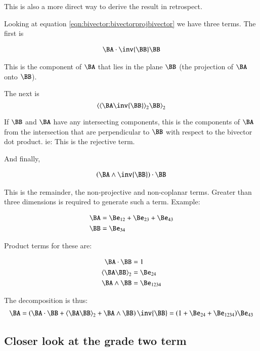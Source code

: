 This is also a more direct way to derive the result in retrospect.

Looking at equation \ref{eqn:bivector:bivectorprojbivector} we have three terms.  The first is

\begin{align}\label{eqn:bivector:foo1}
\BA \cdot \inv{\BB} \BB
\end{align}

This is the component of $\BA$ that lies in the plane $\BB$ (the projection of $\BA$ onto $\BB$).

The next is
\begin{equation}\label{eqn:bivector:gpgradetwo}
\gpgradetwo{\gpgradetwo{\BA\inv{\BB}} \BB}
\end{equation}

If $\BB$ and $\BA$ have any intersecting components, this is the components of $\BA$ from the intersection that are perpendicular to $\BB$ with respect to the bivector dot product.  ie: This is the rejective term.

And finally,

\begin{align}\label{eqn:bivector:foo2}
\left(\BA \wedge \inv{\BB}\right) \cdot \BB
\end{align}

This is the remainder, the non-projective and non-coplanar terms.  Greater than three dimensions is required to generate such a term.  Example:

\begin{align*}
\BA &= \Be_{12} + \Be_{23} + \Be_{43} \\
\BB &= \Be_{34} \\
\end{align*}

Product terms for these are:

\begin{align*}
\BA \cdot \BB &= 1 \\
\gpgradetwo{\BA \BB} &= \Be_{24} \\
\BA \wedge \BB &= \Be_{1234} \\
\end{align*}

The decomposition is thus:
\begin{align*}
\BA = \left(\BA \cdot \BB + \gpgradetwo{\BA \BB} + \BA \wedge \BB\right) \inv{\BB} = (1 + \Be_{24} + \Be_{1234}) \Be_{43}
\end{align*}

\subsection{Closer look at the grade two term }

